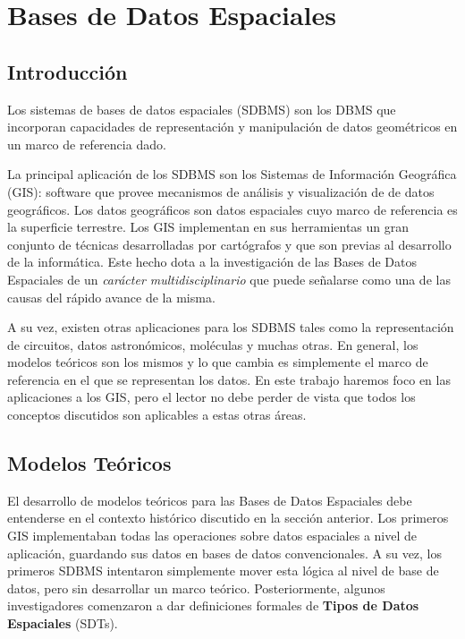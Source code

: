\newcommand{\concept}{\textbf}

\chapter{Bases de Datos Espaciales}  \label{cap:e}

\section{Introducción}


Los sistemas de bases de datos espaciales (SDBMS) son los DBMS que incorporan capacidades de representación y manipulación de
datos geométricos en un marco de referencia dado.

La principal aplicación de los SDBMS son los Sistemas de Información Geográfica (GIS): software que provee mecanismos de análisis
y visualización de de datos geográficos. Los datos geográficos son datos espaciales cuyo marco de referencia  es la superficie terrestre.
Los GIS implementan en sus herramientas un gran conjunto de técnicas desarrolladas por cartógrafos y que son previas al desarrollo de la informática.
Este hecho dota a la investigación de las Bases de Datos Espaciales de un \emph{carácter multidisciplinario} que puede señalarse como
una de las causas del rápido avance de la misma.

A su vez, existen otras aplicaciones para los SDBMS tales como la representación de circuitos, datos astronómicos, moléculas y muchas otras.
En general, los modelos teóricos son los mismos y lo que cambia es simplemente el marco de referencia en el que se representan los datos.
En este trabajo haremos foco en las aplicaciones a los GIS, pero el lector no debe perder de vista que todos los conceptos discutidos
son aplicables a estas otras áreas.

\section{Modelos Teóricos}

El desarrollo de modelos teóricos para las Bases de Datos Espaciales debe entenderse en el contexto histórico discutido en la sección anterior.
Los primeros GIS implementaban todas las operaciones sobre datos espaciales a nivel de aplicación,
guardando sus datos en bases de datos convencionales.
A su vez, los primeros SDBMS intentaron simplemente mover esta lógica al nivel de base de datos, pero sin desarrollar un marco teórico.
Posteriormente, algunos investigadores comenzaron a dar definiciones formales de \concept{Tipos de Datos Espaciales} (SDTs).

